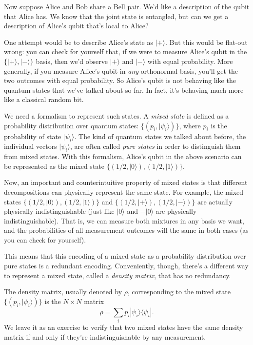 \documentclass[12pt]{report}
\theoremstyle{plain}
\theoremstyle{definition}
\renewcommand{\ket}[1]{|#1\rangle}
\newcommand{\ketbra}[2]{|#1\rangle\!\langle#2|}
\begin{document}
Now suppose Alice and Bob share a Bell pair. We'd like a description of the qubit that Alice has. We know that the joint state is entangled, but can we get a description of Alice's qubit that's local to Alice?

One attempt would be to describe Alice's state as $\ket{+}$. But this would be flat-out wrong: you can check for yourself that, if we were to measure Alice's qubit in the $\{\ket{+}, \ket{-}\}$ basis, then we'd observe $\ket{+}$ and $\ket{-}$ with equal probability. More generally, if you measure Alice's qubit in \emph{any} orthonormal basis, you'll get the two outcomes with equal probability. So Alice's qubit is not behaving like the quantum states that we've talked about so far. In fact, it's behaving much more like a classical random bit.

We need a formalism to represent such states. A \emph{mixed state} is defined as a probability distribution over quantum states: $\{(p_i, \ket{\psi_i})\}$, where $p_i$ is the probability of state $\ket{\psi_i}$. The kind of quantum states we talked about before, the individual vectors $\ket{\psi_i}$, are often called \emph{pure states} in order to distinguish them from mixed states. With this formalism, Alice's qubit in the above scenario can be represented as the mixed state $\{(1/2, \ket{0}), (1/2, \ket{1})\}$.

Now, an important and counterintuitive property of mixed states is that different decompositions can physically represent the same state. For example, the mixed states $\{(1/2, \ket{0}), (1/2, \ket{1})\}$ and $\{(1/2, \ket{+}), (1/2, \ket{-})\}$ are actually physically indistinguishable (just like $\ket{0}$ and $-\ket{0}$ are physically indistinguishable).  That is, we can measure both mixtures in any basis we want, and the probabilities of all measurement outcomes will the same in both cases (as you can check for yourself).

This means that this encoding of a mixed state as a probability distribution over pure states is a redundant encoding.  Conveniently, though, there's a different way to represent a mixed state, called a \emph{density matrix}, that has no redundancy.

The density matrix, usually denoted by $\rho$, corresponding to the mixed state $\{(p_i, \ket{\psi_i})\}$ is the $N\times N$ matrix
\[
\rho = \sum_i p_i \ketbra{\psi_i}{\psi_i}.
\]
We leave it as an exercise to verify that two mixed states have the same density matrix if and only if they're indistinguishable by any measurement.
\end{document}
